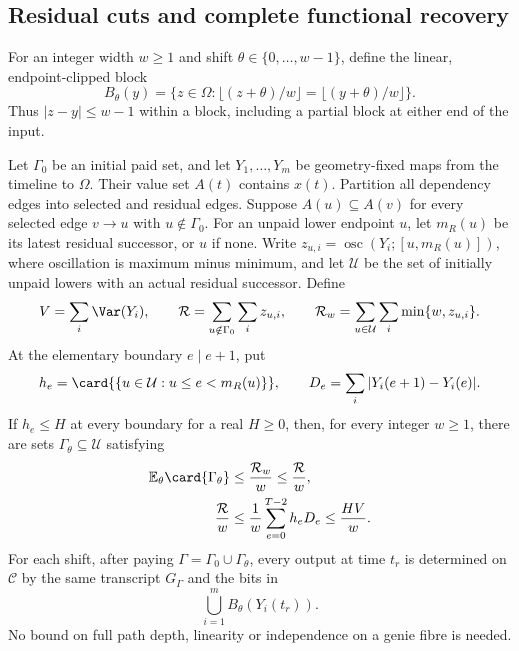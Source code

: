 \subsection{Residual cuts and complete functional recovery}

For an integer width $w\ge1$ and shift
$\theta\in\{0,\ldots,w-1\}$, define the linear, endpoint-clipped block
\begin{equation}\label{eq:raw-block}
 B_\theta(y)=
 \{z\in\Omega:\lfloor(z+\theta)/w\rfloor
                   =\lfloor(y+\theta)/w\rfloor\}.
\end{equation}
Thus $|z-y|\le w-1$ within a block, including a partial block at either
end of the input.

\begin{lemma}\label{lem:residual-source-recovery}
Let $\Gamma_0$ be an initial paid set, and let $Y_1,\ldots,Y_m$ be
geometry-fixed maps from the timeline to $\Omega$. Their value set
$A(t)$ contains $x(t)$. Partition all dependency edges into selected
and residual edges. Suppose $A(u)\subseteq A(v)$ for every selected
edge $v\to u$ with $u\notin\Gamma_0$. For an unpaid lower endpoint
$u$, let $m_R(u)$ be its latest residual successor, or $u$ if none.
Write $z_{u,i}=\operatorname{osc}(Y_i;[u,m_R(u)])$, where oscillation
is maximum minus minimum, and let $\mathcal U$ be the set of initially
unpaid lowers with an actual residual successor. Define
\[
 V=\sum_i\Var(Y_i),\qquad
 \mathcal R=\sum_{u\notin\Gamma_0}\sum_i z_{u,i},\qquad
 \mathcal R_w=\sum_{u\in\mathcal U}\sum_i\min\{w,z_{u,i}\}.
\]
At the elementary boundary $e\mid e+1$, put
\[
 h_e=\card{\{u\in\mathcal U:u\le e<m_R(u)\}},\qquad
 D_e=\sum_i|Y_i(e+1)-Y_i(e)|.
\]
If $h_e\le H$ at every boundary for a real $H\ge0$, then, for every
integer $w\ge1$, there are
sets $\Gamma_\theta\subseteq\mathcal U$ satisfying
\begin{equation}\label{eq:residual-average}
 \begin{aligned}
 \mathbb E_\theta\card{\Gamma_\theta}
       &\le\frac{\mathcal R_w}{w}\le\frac{\mathcal R}{w},\\
 \frac{\mathcal R}{w}
       &\le\frac1w\sum_{e=0}^{T-2}h_eD_e\le\frac{HV}{w}.
 \end{aligned}
\end{equation}
For each shift, after paying
$\Gamma=\Gamma_0\cup\Gamma_\theta$, every output at time $t_r$ is
determined on $\mathcal C$ by the same transcript $G_\Gamma$ and the
bits in
\begin{equation}\label{eq:complete-bank-recovery}
 \bigcup_{i=1}^m B_\theta(Y_i(t_r)).
\end{equation}
No bound on full path depth, linearity or independence on a genie fibre
is needed.
\end{lemma}


